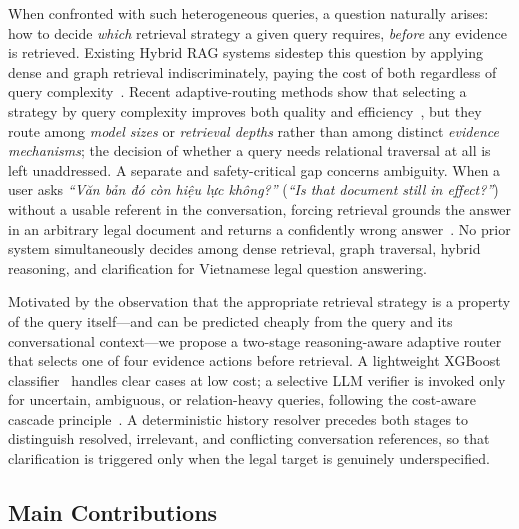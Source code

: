 When confronted with such heterogeneous queries, a question naturally arises:
how to decide \emph{which} retrieval strategy a given query requires,
\emph{before} any evidence is retrieved. Existing Hybrid RAG systems sidestep
this question by applying dense and graph retrieval indiscriminately, paying
the cost of both regardless of query
complexity~\cite{edge2024graphrag,he2024lightrag,gao2023modularrag}. Recent
adaptive-routing methods show that selecting a strategy by query complexity
improves both quality and
efficiency~\cite{jeong2024adaptive,chen2023frugalgpt,ong2024routellm}, but
they route among \emph{model sizes} or \emph{retrieval depths} rather than
among distinct \emph{evidence mechanisms}; the decision of whether a query
needs relational traversal at all is left unaddressed. A separate and
safety-critical gap concerns ambiguity. When a user asks \textit{``Văn bản đó
còn hiệu lực không?''} (\textit{``Is that document still in effect?''})
without a usable referent in the conversation, forcing retrieval grounds the
answer in an arbitrary legal document and returns a confidently wrong
answer~\cite{min2020ambigqa,elgohary2019canard}. No prior system
simultaneously decides among dense retrieval, graph traversal, hybrid
reasoning, and clarification for Vietnamese legal question answering.

Motivated by the observation that the appropriate retrieval strategy is a
property of the query itself---and can be predicted cheaply from the query
and its conversational context---we propose a two-stage reasoning-aware
adaptive router that selects one of four evidence actions before retrieval. A
lightweight XGBoost classifier~\cite{chen2016xgboost} handles clear cases at
low cost; a selective LLM verifier is invoked only for uncertain, ambiguous,
or relation-heavy queries, following the cost-aware cascade
principle~\cite{chen2023frugalgpt,ong2024routellm}. A deterministic history
resolver precedes both stages to distinguish resolved, irrelevant, and
conflicting conversation references, so that clarification is triggered only
when the legal target is genuinely underspecified.

\subsection{Main Contributions}\label{subsec:contributions}

